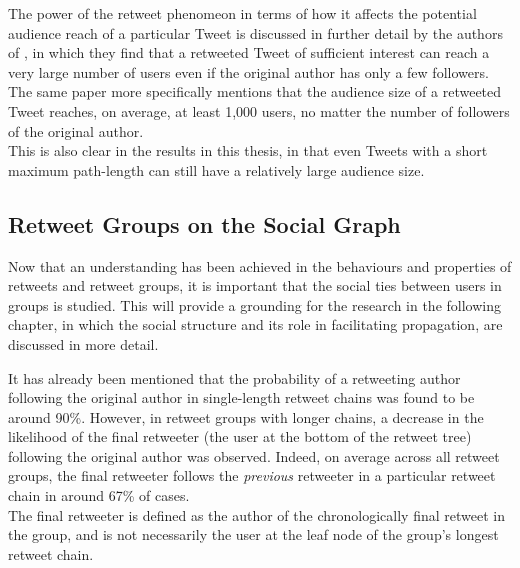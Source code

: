 The power of the retweet phenomeon in terms of how it affects the potential audience reach of a particular Tweet is discussed in further detail by the authors of \cite{kwak10}, in which they find that a retweeted Tweet of sufficient interest can reach a very large number of users even if the original author has only a few followers. The same paper more specifically mentions that the audience size of a retweeted Tweet reaches, on average, at least 1,000 users, no matter the number of followers of the original author.\\
This is also clear in the results in this thesis, in that even Tweets with a short maximum path-length can still have a relatively large audience size.


\subsection{Retweet Groups on the Social Graph}
Now that an understanding has been achieved in the behaviours and properties of retweets and retweet groups, it is important that the social ties between users in groups is studied. This will provide a grounding for the research in the following chapter, in which the social structure and its role in facilitating propagation, are discussed in more detail.

It has already been mentioned that the probability of a retweeting author following the original author in single-length retweet chains was found to be around 90\%. However, in retweet groups with longer chains, a decrease in the likelihood of the final retweeter (the user at the bottom of the retweet tree) following the original author was observed. Indeed, on average across all retweet groups, the final retweeter follows the \textit{previous} retweeter in a particular retweet chain in around 67\% of cases.\\
The final retweeter is defined as the author of the chronologically final retweet in the group, and is not necessarily the user at the leaf node of the group's longest retweet chain.


